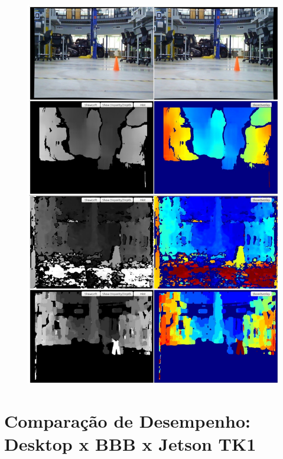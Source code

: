 \begin{figure}[H]
 	\centering
 	\includegraphics[scale=0.35]{./Resources/results/scene2_montage.jpg}
 	\caption{}
 	\label{scene2_montage}
\end{figure}

\section{Comparação de Desempenho: Desktop x BBB x Jetson TK1}
\label{resultsComparison}

